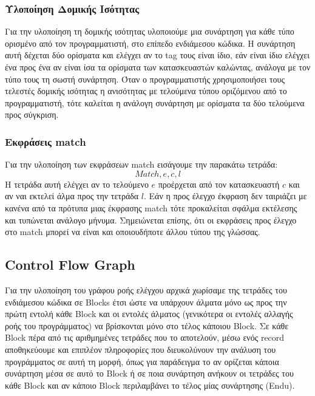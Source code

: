 \documentclass[12pt]{article}
\begin{document}
\subsubsection{Υλοποίηση Δομικής Ισότητας}
Για την υλοποίηση τη δομικής ισότητας υλοποιούμε μια συνάρτηση για κάθε τύπο ορισμένο από τον προγραμματιστή, στο επίπεδο ενδιάμεσου κώδικα. Η συνάρτηση αυτή δέχεται δύο ορίσματα και ελέγχει αν το tag τους είναι ίδιο, εάν είναι ίδιο ελέγχει ένα προς ένα αν είναι ίσα τα ορίσματα των κατασκευαστών καλώντας, ανάλογα με τον τύπο τους τη σωστή συνάρτηση. Όταν ο προγραμματιστής χρησιμοποιήσει τους τελεστές δομικής ισότητας η ανισότητας με τελούμενα τύπου οριζόμενου από το προγραμματιστή, τότε καλείται η ανάλογη συνάρτηση με ορίσματα τα δύο τελούμενα προς σύγκριση. 

  
\subsubsection{Εκφράσεις match}
Για την υλοποίηση των εκφράσεων match εισάγουμε την παρακάτω τετράδα:
$$ Match, e, c, l$$
Η τετράδα αυτή ελέγχει αν το τελούμενο $e$ προέρχεται από τον κατασκευαστή $c$ και αν ναι εκτελεί άλμα προς την τετράδα $l$.  Εάν η προς έλεγχο έκφραση δεν ταιριάζει με κανένα από τα πρότυπα μιας έκφρασης match τότε προκαλείται σφάλμα εκτέλεσης και τυπώνεται ανάλογο μήνυμα. Σημειώνεται επίσης, ότι οι εκφράσεις προς έλεγχο στο match μπορεί να είναι και οποιουδήποτε άλλου τύπου της γλώσσας. 

\subsection{Control Flow Graph}
Για την υλοποίηση του γράφου ροής ελέγχου αρχικά χωρίσαμε της τετράδες του ενδιάμεσου κώδικα σε Blocks έτσι ώστε να υπάρχουν άλματα μόνο ως προς την πρώτη εντολή κάθε Block και οι εντολές άλματος
(γενικότερα οι εντολές αλλαγής ροής του προγράμματος) να βρίσκονται μόνο στο τέλος κάποιου Block. Σε κάθε Block πέρα από τις αριθμημένες τετράδες που το αποτελούν, μέσω ενός record αποθηκεύουμε και επιπλέον πληροφορίες που διευκολύνουν την ανάλυση του προγράμματος σε αυτή τη μορφή, όπως για παράδειγμα το αν ορίζεται κάποια συνάρτηση μέσα σε αυτό το Block ή σε ποια συνάρτηση ανήκουν οι τετράδες του κάθε Block και αν κάποιο Block περιλαμβάνει το τέλος μίας συνάρτησης (Endu).
\end{document}

